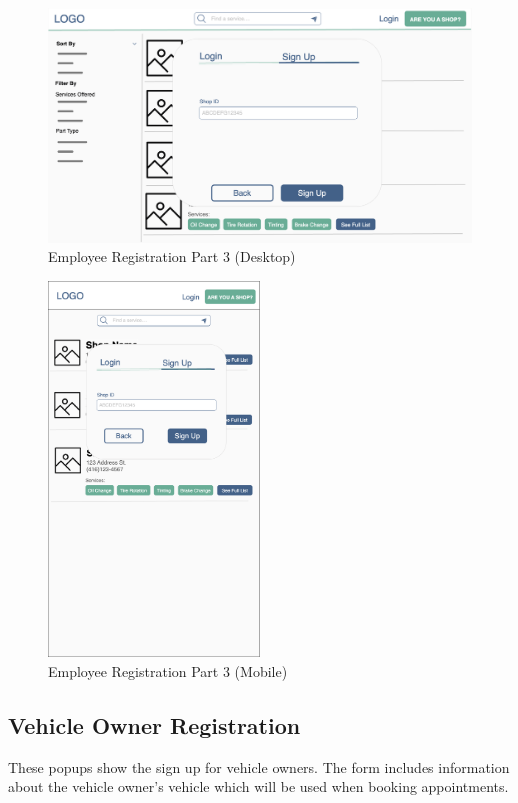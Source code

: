 \documentclass[12pt, titlepage]{article}
\begin{document}
\begin{figure}[H]
	\centering
	\includegraphics[width=\textwidth]{mockups/Employee Signup (Part 2) (Desktop).png}
	\caption{Employee Registration \textemdash{} Part 3 (Desktop)}
\end{figure}

\begin{figure}[H]
	\centering
	\includegraphics[width=0.5\textwidth]{mockups/Employee Signup (Part 2) (Mobile).png}
	\caption{Employee Registration \textemdash{} Part 3 (Mobile)}
\end{figure}

\subsection{Vehicle Owner Registration}
These popups show the sign up for vehicle owners. The form includes information about the vehicle
owner's vehicle which will be used when booking appointments.
\end{document}
